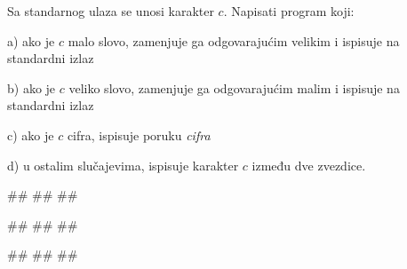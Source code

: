 \begin{Exercise}[label=p1.2_06] 
 Sa standarnog ulaza se unosi karakter $c$. Napisati program koji:
 \begin{description}
\item{a)} ako je $c$ malo slovo, zamenjuje ga odgovarajućim velikim i ispisuje na standardni izlaz
\item{b)} ako je $c$ veliko slovo, zamenjuje ga odgovarajućim malim i ispisuje na standardni izlaz
\item{c)} ako je $c$ cifra, ispisuje poruku \textit{cifra}
\item{d)} u ostalim slučajevima, ispisuje karakter $c$ između dve zvezdice.
\end{description}

\begin{miditest}
\begin{upotreba}{1}
#\naslovInt#
##
##
\end{upotreba}
\end{miditest}
\begin{miditest}
\begin{upotreba}{2}
#\naslovInt#
##
##
\end{upotreba}
\end{miditest}

\begin{miditest}
\begin{upotreba}{3}
#\naslovInt#
#\ulaz{>}#
#\izlaz{*>*}#
\end{upotreba}
\end{miditest}

\end{Exercise}
\begin{Answer}[ref=p1.2_06]
\end{Answer}

